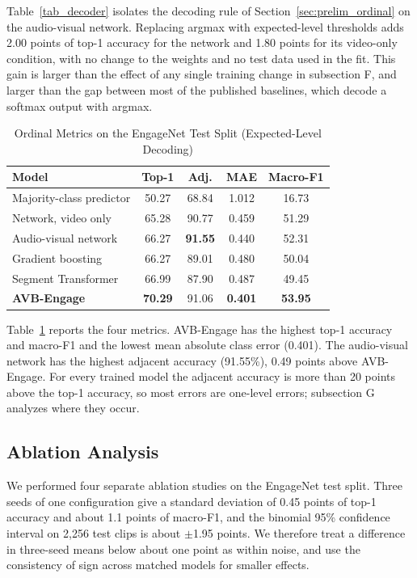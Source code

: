 \documentclass[journal]{IEEEtran}
\newcommand{\ournet}{AVB-Engage}
\begin{document}
Table~\ref{tab_decoder} isolates the decoding rule of Section~\ref{sec:prelim_ordinal} on the audio-visual network. Replacing argmax with expected-level thresholds adds 2.00 points of top-1 accuracy for the network and 1.80 points for its video-only condition, with no change to the weights and no test data used in the fit. This gain is larger than the effect of any single training change in subsection F, and larger than the gap between most of the published baselines, which decode a softmax output with argmax.

\begin{table}[!t]
\setlength{\tabcolsep}{3pt}
\renewcommand{\arraystretch}{1.2}
\caption{Ordinal Metrics on the EngageNet Test Split (Expected-Level Decoding)}
\label{tab_ordinal}
\centering
\begin{tabular}{lcccc}
\hline
Model & Top-1 & Adj. & MAE & Macro-F1\\
\hline
Majority-class predictor & 50.27 & 68.84 & 1.012 & 16.73\\
Network, video only & 65.28 & 90.77 & 0.459 & 51.29\\
Audio-visual network & 66.27 & \textbf{91.55} & 0.440 & 52.31\\
Gradient boosting & 66.27 & 89.01 & 0.480 & 50.04\\
Segment Transformer & 66.99 & 87.90 & 0.487 & 49.45\\
\textbf{\ournet} & \textbf{70.29} & 91.06 & \textbf{0.401} & \textbf{53.95}\\
\hline
\end{tabular}
\end{table}

Table~\ref{tab_ordinal} reports the four metrics. \ournet{} has the highest top-1 accuracy and macro-F1 and the lowest mean absolute class error (0.401). The audio-visual network has the highest adjacent accuracy (91.55\%), 0.49 points above \ournet. For every trained model the adjacent accuracy is more than 20 points above the top-1 accuracy, so most errors are one-level errors; subsection G analyzes where they occur.

\subsection{Ablation Analysis}
\label{sec:ablation}

We performed four separate ablation studies on the EngageNet test split. Three seeds of one configuration give a standard deviation of 0.45 points of top-1 accuracy and about 1.1 points of macro-F1, and the binomial 95\% confidence interval on 2,256 test clips is about $\pm$1.95 points. We therefore treat a difference in three-seed means below about one point as within noise, and use the consistency of sign across matched models for smaller effects.
\end{document}
